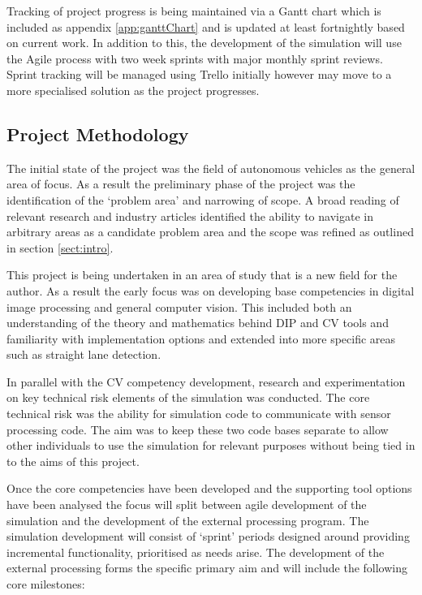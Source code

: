 \documentclass[]{aiaa-tc}%
\begin{document}
Tracking of project progress is being maintained via a Gantt chart which is included as appendix \ref{app:ganttChart} and is updated at least fortnightly based on current work. In addition to this, the development of the simulation will use the Agile process with two week sprints with major monthly sprint reviews. Sprint tracking will be managed using Trello initially however may move to a more specialised solution as the project progresses.

\subsection{Project Methodology}

The initial state of the project was the field of autonomous vehicles as the general area of focus. As a result the preliminary phase of the project was the identification of the `problem area' and narrowing of scope. A broad reading of relevant research and industry articles identified the ability to navigate in arbitrary areas as a candidate problem area and the scope was refined as outlined in section \ref{sect:intro}. 

This project is being undertaken in an area of study that is a new field for the author. As a result the early focus was on developing base competencies in digital image processing and general computer vision. This included both an understanding of the theory and mathematics behind DIP and CV tools and familiarity with implementation options and extended into more specific areas such as straight lane detection.

In parallel with the CV competency development, research and experimentation on key technical risk elements of the simulation was conducted. The core technical risk was the ability for simulation code to communicate with sensor processing code. The aim was to keep these two code bases separate to allow other individuals to use the simulation for relevant purposes without being tied in to the aims of this project.

Once the core competencies have been developed and the supporting tool options have been analysed the focus will split between agile development of the simulation and the development of the external processing program. The simulation development will consist of `sprint' periods designed around providing incremental functionality, prioritised as needs arise. The development of the external processing forms the specific primary aim and will include the following core milestones:
\end{document}
